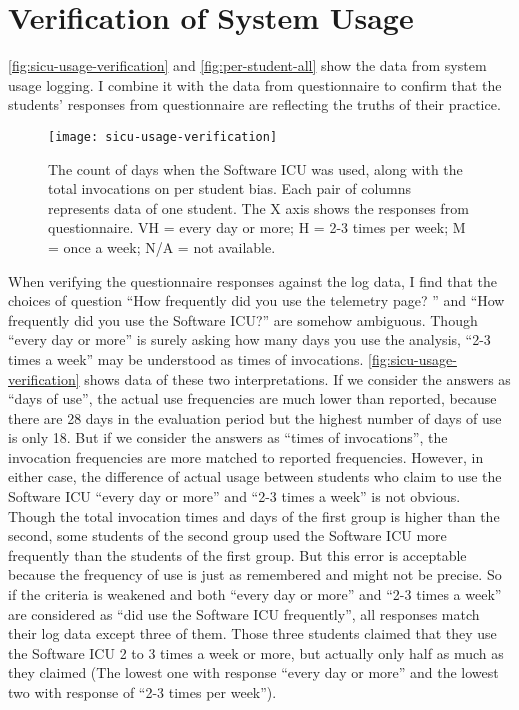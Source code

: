 \section {Verification of System Usage}

\autoref{fig:sicu-usage-verification} and \autoref{fig:per-student-all} show the data from system usage logging. I combine it with the data from questionnaire to confirm that the students' responses from questionnaire are reflecting the truths of their practice. 

\begin{figure}[htbp] %
   \centering
   \texttt{[image: sicu-usage-verification]} 
   \caption[SICU usage on per student bias]{The count of days when the Software ICU was used, along with the total invocations on per student bias. Each pair of columns represents data of one student. The X axis shows the responses from questionnaire. VH = every day or more; H = 2-3 times per week; M = once a week; N/A = not available.}
   \label{fig:sicu-usage-verification}
\end{figure}

When verifying the questionnaire responses against the log data, I find that the choices of question ``How frequently did you use the telemetry page? '' and ``How frequently did you use the Software ICU?'' are somehow ambiguous. Though ``every day or more'' is surely asking how many days you use the analysis, ``2-3 times a week'' may be understood as times of invocations. \autoref{fig:sicu-usage-verification} shows data of these two interpretations. If we consider the answers as ``days of use'', the actual use frequencies are much lower than reported, because there are 28 days in the evaluation period but the highest number of days of use is only 18. But if we consider the answers as ``times of invocations'', the invocation frequencies are more matched to reported frequencies. However, in either case, the difference of actual usage between students who claim to use the Software ICU ``every day or more'' and ``2-3 times a week'' is not obvious. Though the total invocation times and days of the first group is higher than the second, some students of the second group used the Software ICU more frequently than the students of the first group. But this error is acceptable because the frequency of use is just as remembered and might not be precise. So if the criteria is weakened and both ``every day or more'' and ``2-3 times a week'' are considered as ``did use the Software ICU frequently'', all responses match their log data except three of them. Those three students claimed that they use the Software ICU 2 to 3 times a week or more, but actually only half as much as they claimed (The lowest one with response ``every day or more'' and the lowest two with response of ``2-3 times per week'').

